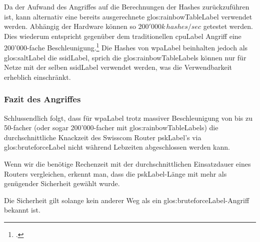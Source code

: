Da der Aufwand des Angriffes auf die Berechnungen der Hashes zurückzuführen ist, kann alternativ eine bereits ausgerechnete \gls{glos:rainbowTableLabel} verwendet werden.
Abhängig der Hardware können so $200'000k\,hashes/sec$ getestet werden. Dies wiederum entspricht gegenüber dem traditionellen \gls{cpuLabel} Angriff eine 200'000-fache Beschleunigung.\footcite[][160]{WrightCache201503}
Die Hashes von \gls{wpaLabel} beinhalten jedoch als \gls{glos:saltLabel} die \gls{ssidLabel}, sprich die \glspl{glos:rainbowTableLabel} können nur für Netze mit der selben \gls{ssidLabel} verwendet werden, was die Verwendbarkeit erheblich einschränkt.


\subsubsection{Fazit des Angriffes}
Schlussendlich folgt, dass für \gls{wpaLabel} trotz massiver Beschleunigung von bis zu 50-facher (oder sogar 200'000-facher mit \glspl{glos:rainbowTableLabel}) die durchschnittliche Knackzeit des Swisscom Router \gls{pskLabel}'s via \gls{glos:bruteforceLabel} nicht während Lebzeiten abgeschlossen werden kann.

Wenn wir die benötige Rechenzeit mit der durchschnittlichen Einsatzdauer eines Routers vergleichen, erkennt man, dass die \gls{pskLabel}-Länge mit mehr als genügender Sicherheit gewählt wurde.

Die Sicherheit gilt solange kein anderer Weg als ein \gls{glos:bruteforceLabel}-Angriff bekannt ist.
